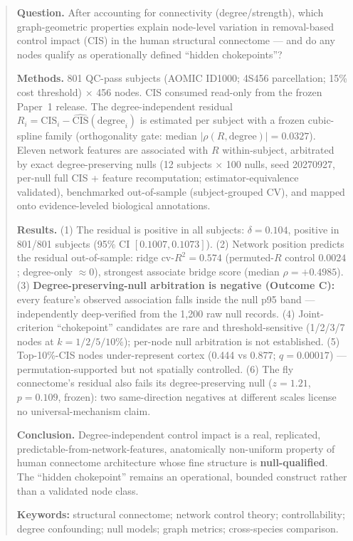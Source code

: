 \documentclass[11pt,a4paper]{article}
\newcommand{\del}{\delta}
\begin{document}
\begin{abstract}
\noindent\textbf{Question.} After accounting for connectivity
(degree/strength), which graph-geometric properties explain node-level
variation in removal-based control impact (CIS) in the human structural
connectome --- and do any nodes qualify as operationally defined ``hidden
chokepoints''?

\smallskip\noindent\textbf{Methods.} 801 QC-pass subjects (AOMIC ID1000;
4S456 parcellation; 15\% cost threshold) $\times$ 456 nodes. CIS consumed
read-only from the frozen Paper~1 release. The degree-independent residual
$R_i=\mathrm{CIS}_i-\widehat{\mathrm{CIS}}(\mathrm{degree}_i)$ is estimated
per subject with a frozen cubic-spline family (orthogonality gate: median
$|\rho(R,\mathrm{degree})|=0.0327$). Eleven network features are associated
with $R$ within-subject, arbitrated by exact degree-preserving nulls
(12 subjects $\times$ 100 nulls, seed 20270927, per-null full CIS + feature
recomputation; estimator-equivalence validated), benchmarked out-of-sample
(subject-grouped CV), and mapped onto evidence-leveled biological
annotations.

\smallskip\noindent\textbf{Results.} (1) The residual is positive in all
subjects: $\del=0.104$, positive in 801/801 subjects (95\% CI
$[0.1007,0.1073]$). (2) Network position predicts the residual
out-of-sample: ridge cv-$R^2=0.574$ (permuted-$R$ control $0.0024$;
degree-only $\approx 0$), strongest associate bridge score (median
$\rho=+0.4985$). (3) \textbf{Degree-preserving-null arbitration is negative
(Outcome C):} every feature's observed association falls inside the null
p95 band --- independently deep-verified from the 1{,}200 raw null records.
(4) Joint-criterion ``chokepoint'' candidates are rare and
threshold-sensitive (1/2/3/7 nodes at $k=1/2/5/10\%$); per-node null
arbitration is not established. (5) Top-10\%-CIS nodes under-represent
cortex (0.444 vs 0.877; $q=0.00017$) --- permutation-supported but not
spatially controlled. (6) The fly connectome's residual also fails its
degree-preserving null ($z=1.21$, $p=0.109$, frozen): two same-direction
negatives at different scales license no universal-mechanism claim.

\smallskip\noindent\textbf{Conclusion.} Degree-independent control impact
is a real, replicated, predictable-from-network-features, anatomically
non-uniform property of human connectome architecture whose fine structure
is \textbf{null-qualified}. The ``hidden chokepoint'' remains an
operational, bounded construct rather than a validated node class.

\smallskip\noindent
\textbf{Keywords:} structural connectome; network control theory;
controllability; degree confounding; null models; graph metrics;
cross-species comparison.
\end{abstract}
\end{document}
